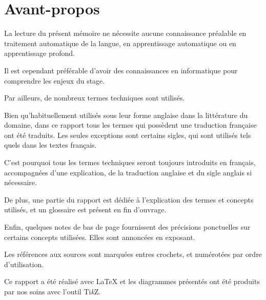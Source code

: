\section*{Avant-propos} %
La lecture du présent mémoire ne nécessite aucune connaissance préalable en traitement automatique de la langue, en apprentissage automatique ou en apprentissage profond.

Il est cependant préférable d'avoir des connaissances en informatique pour comprendre les enjeux du stage.

Par ailleurs, de nombreux termes techniques sont utilisés.

Bien qu'habituellement utilisés sous leur forme anglaise dans la littérature du domaine, dans ce rapport tous les termes qui possèdent une traduction française ont été traduits.
Les seules exceptions sont certains sigles, qui sont utilisés tels quels dans les textes français.

C'est pourquoi tous les termes techniques seront toujours introduits en français, accompagnées d'une explication, de la traduction anglaise et du sigle anglais si nécessaire.


De plus, une partie du rapport est dédiée à l'explication des termes et concepts utilisés, et un glossaire est présent en fin d'ouvrage.



Enfin, quelques notes de bas de page fournissent des précisions ponctuelles sur certains concepts utilisées. Elles sont annoncées en exposant. 

Les références aux sources sont marquées entres crochets, et numérotées par ordre d'utilisation.

Ce rapport a été réalisé avec \LaTeX{} et les diagrammes présentés ont été produits par nos soins avec l'outil Ti\textit{k}Z.